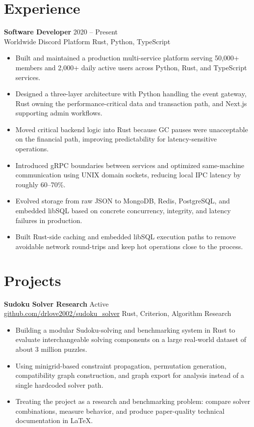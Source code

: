 \documentclass[10pt,a4paper]{article}
\newcommand{\resumesubheading}[4]{
  \textbf{#1} \hfill #2 \\
  #3 \hfill #4
}
\begin{document}
\section*{Experience}
\resumesubheading{Software Developer}{2020 -- Present}{Worldwide Discord Platform}{Rust, Python, TypeScript}
\begin{itemize}
  \item Built and maintained a production multi-service platform serving 50{,}000+ members and 2{,}000+ daily active users across Python, Rust, and TypeScript services.
  \item Designed a three-layer architecture with Python handling the event gateway, Rust owning the performance-critical data and transaction path, and Next.js supporting admin workflows.
  \item Moved critical backend logic into Rust because GC pauses were unacceptable on the financial path, improving predictability for latency-sensitive operations.
  \item Introduced gRPC boundaries between services and optimized same-machine communication using UNIX domain sockets, reducing local IPC latency by roughly 60--70\%.
  \item Evolved storage from raw JSON to MongoDB, Redis, PostgreSQL, and embedded libSQL based on concrete concurrency, integrity, and latency failures in production.
  \item Built Rust-side caching and embedded libSQL execution paths to remove avoidable network round-trips and keep hot operations close to the process.
\end{itemize}

\section*{Projects}
\resumesubheading{Sudoku Solver Research}{Active}{\href{https://github.com/drlove2002/sudoku_solver}{github.com/drlove2002/sudoku\_solver}}{Rust, Criterion, Algorithm Research}
\begin{itemize}
  \item Building a modular Sudoku-solving and benchmarking system in Rust to evaluate interchangeable solving components on a large real-world dataset of about 3 million puzzles.
  \item Using minigrid-based constraint propagation, permutation generation, compatibility graph construction, and graph export for analysis instead of a single hardcoded solver path.
  \item Treating the project as a research and benchmarking problem: compare solver combinations, measure behavior, and produce paper-quality technical documentation in LaTeX.
\end{itemize}
\end{document}
